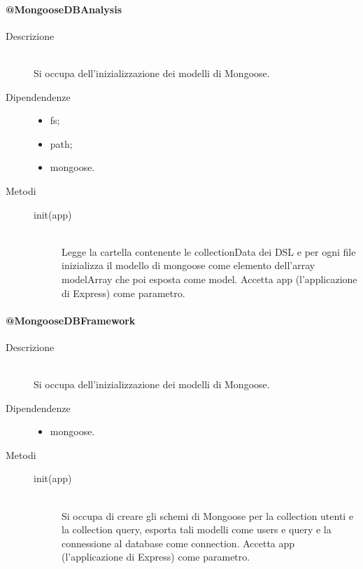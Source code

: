 \paragraph{@MongooseDBAnalysis}
\begin{description}
 \item[Descrizione] \hfill \\
 Si occupa dell'inizializzazione dei modelli di Mongoose.
 \item[Dipendendenze] \hfill
    \begin{itemize}
    \item fs;
    \item path;
    \item mongoose.
    \end{itemize}
\item[Metodi] \hfill
 \begin{description}
 \item[init(app)] \hfill \\
 Legge la cartella contenente le collectionData dei DSL e per ogni file inizializza il modello di mongoose come elemento dell'array modelArray che poi esposta come model. Accetta app (l'applicazione di Express) come parametro.
 \end{description}
\end{description}

\paragraph{@MongooseDBFramework}
\begin{description}
 \item[Descrizione] \hfill \\
 Si occupa dell'inizializzazione dei modelli di Mongoose.
  \item[Dipendendenze] \hfill
  \begin{itemize}
  \item mongoose.
  \end{itemize}
\item[Metodi] \hfill
 \begin{description}
 \item[init(app)] \hfill \\
 Si occupa di creare gli schemi di Mongoose per la collection utenti e la collection query, esporta tali modelli come users e query e la connessione al database come connection. Accetta app (l'applicazione di Express) come parametro.
 \end{description}
\end{description}

